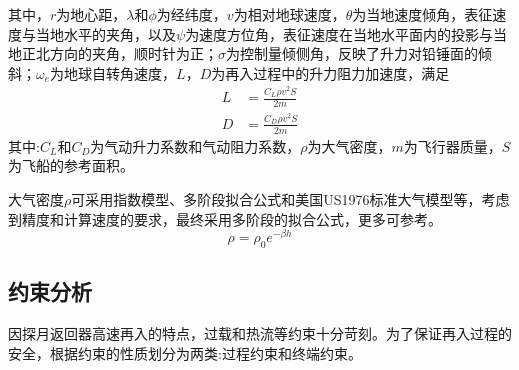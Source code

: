 其中，$r$为地心距，$\lambda$和$\phi$为经纬度，$v$为相对地球速度，$\theta$为当地速度倾角，表征速度与当地水平的夹角，以及$\psi$为速度方位角，表征速度在当地水平面内的投影与当地正北方向的夹角，顺时针为正；$\sigma$为控制量倾侧角，反映了升力对铅锤面的倾斜；$ \omega_e $为地球自转角速度，$L$，$D$为再入过程中的升力阻力加速度，满足
\begin{align}
	L & =\frac{C_L\rho v^2S}{2m} \\
	D & =\frac{C_D\rho v^2S}{2m}
\end{align}
其中:$ C_L $和$ C_D $为气动升力系数和气动阻力系数，$ \rho $为大气密度，$ m $为飞行器质量，$ S $为飞船的参考面积。

大气密度$ \rho $可采用指数模型、多阶段拟合公式和美国US1976标准大气模型等，考虑到精度和计算速度的要求，最终采用多阶段的拟合公式，更多可参考。
\begin{equation}
	\rho=\rho_0 e^{-\beta h}
\end{equation}

\subsection{约束分析}
因探月返回器高速再入的特点，过载和热流等约束十分苛刻。为了保证再入过程的安全，根据约束的性质划分为两类:过程约束和终端约束。
